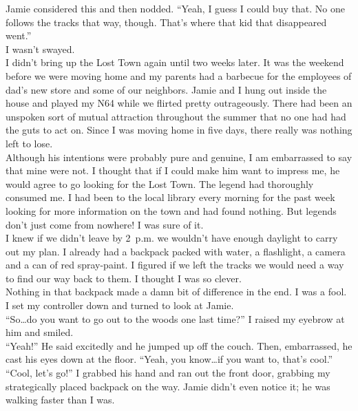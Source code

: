 \documentclass[a5paper]{scrartcl}
\begin{document}
Jamie considered this and then nodded. \enquote{Yeah, I guess I could buy that. No one follows the tracks that way, though. That's where that kid that disappeared went.} \\


I wasn't swayed.\\


I didn't bring up the Lost Town again until two weeks later. It was the weekend before we were moving home and my parents had a barbecue for the employees of dad's new store and some of our neighbors. Jamie and I hung out inside the house and played my N64 while we flirted pretty outrageously. There had been an unspoken sort of mutual attraction throughout the summer that no one had had the guts to act on. Since I was moving home in five days, there really was nothing left to lose. \\


Although his intentions were probably pure and genuine, I am embarrassed to say that mine were not. I thought that if I could make him want to impress me, he would agree to go looking for the Lost Town. The legend had thoroughly consumed me. I had been to the local library every morning for the past week looking for more information on the town and had found nothing. But legends don't just come from nowhere! I was sure of it.\\


I knew if we didn't leave by 2~p.m. we wouldn't have enough daylight to carry out my plan. I already had a backpack packed with water, a flashlight, a camera and a can of red spray-paint. I figured if we left the tracks we would need a way to find our way back to them. I thought I was so clever. \\


Nothing in that backpack made a damn bit of difference in the end. I was a fool.    \\


I set my controller down and turned to look at Jamie. \\


\enquote{So\dots do you want to go out to the woods one last time?} I raised my eyebrow at him and smiled. \\


\enquote{Yeah!} He said excitedly and he jumped up off the couch. Then, embarrassed, he cast his eyes down at the floor. \enquote{Yeah, you know\dots if you want to, that's cool.}\\


\enquote{Cool, let's go!} I grabbed his hand and ran out the front door, grabbing my strategically placed backpack on the way. Jamie didn't even notice it; he was walking faster than I was.\\
\end{document}
